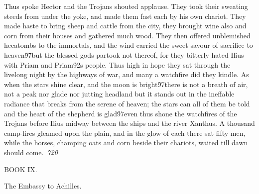 {Thus spoke Hector and the Trojans shouted applause. They took their sweating steeds from under the yoke, and made them fast each by his own chariot. They made haste to bring sheep and cattle from the city, they brought wine also and corn from their houses and gathered much wood. They then offered unblemished hecatombs to the immortals, and the wind carried the sweet savour of sacrifice to heaven\'97but the blessed gods partook not thereof, for they bitterly hated Ilius with Priam and Priam\'92s people. Thus high in hope they sat through the livelong night by the highways of war, and many a watchfire did they kindle. As when the stars shine clear, and the moon is bright\'97there is not a breath of air, not a peak nor glade nor jutting headland but it stands out in the ineffable radiance that breaks from the serene of heaven; the stars can all of them be told and the heart of the shepherd is glad\'97even thus shone the watchfires of the Trojans before Ilius midway between the ships and the river Xanthus. A thousand camp-fires gleamed upon the plain, and in the glow of each there sat fifty men, while the horses, champing oats and corn beside their chariots, waited till dawn should come.\
\pard{}\sl720\qc{}

  BOOK IX.\
\pard{}\qj{}

 \cf2 The Embassy to Achilles.\
\pard{}\qj{}

}
